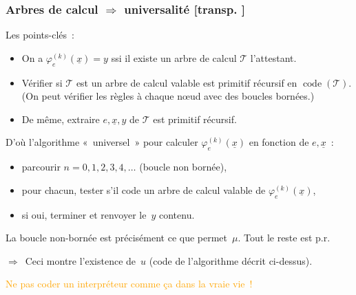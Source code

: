 \documentclass[mathserif,a4paper,aspectratio=169]{beamer}
\renewcommand{\frametitle}[1]{\subsubsection*{#1 {\footnotesize[transp. \insertframenumber]}}}
\begin{document}
\begin{frame}
\frametitle{Arbres de calcul $\Rightarrow$ universalité}

Les points-clés :
\begin{itemize}
\item On a $\varphi_e^{(k)}(\underline{x}) = y$ \alert{ssi} il existe
  un arbre de calcul $\mathscr{T}$ l'attestant.
\item Vérifier si $\mathscr{T}$ est un arbre de calcul valable est
  \alert{primitif récursif} en $\operatorname{code}(\mathscr{T})$.
  (On peut vérifier les règles à chaque nœud avec des boucles
  bornées.)
\item De même, extraire $e,\underline{x},y$ de $\mathscr{T}$ est
  primitif récursif.
\end{itemize}

\bigskip

D'où l'algorithme « universel » pour calculer
$\varphi_e^{(k)}(\underline{x})$ en fonction de $e,\underline{x}$ :
\begin{itemize}
\item parcourir $n=0,1,2,3,4,\ldots$ (boucle non bornée),
\item pour chacun, tester s'il code un arbre de calcul valable de
  $\varphi_e^{(k)}(\underline{x})$,
\item si oui, terminer et renvoyer le $y$ contenu.
\end{itemize}

La boucle non-bornée est précisément ce que permet $\mu$.  Tout le
reste est p.r.

$\Rightarrow$ Ceci montre l'existence de $u$ (code de l'algorithme
décrit ci-dessus).

\bigskip

\textcolor{orange}{Ne pas coder un interpréteur comme ça dans la vraie vie !}

\end{frame}
%
\end{document}
